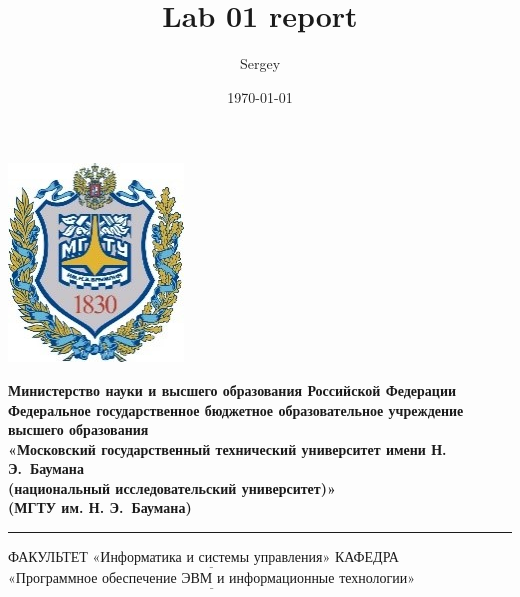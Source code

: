 \documentclass[14pt,russian]{scrartcl}
\title{Lab 01 report}
\author{Sergey}
\date{\today}
\begin{document}
\thispagestyle{empty}

\noindent \begin{minipage}{0.15\textwidth}
	\includegraphics[width=\linewidth]{b_logo}
\end{minipage}
\noindent\begin{minipage}{0.85\textwidth}\centering
	\textbf{Министерство науки и высшего образования Российской Федерации}\\
	\textbf{Федеральное государственное бюджетное образовательное учреждение высшего образования}\\
	\textbf{«Московский государственный технический университет имени Н. Э.~Баумана}\\
	\textbf{(национальный исследовательский университет)»}\\
	\textbf{(МГТУ им. Н. Э.~Баумана)}
\end{minipage}

\noindent\rule{16cm}{3pt}
\newline\newline
\noindent ФАКУЛЬТЕТ $\underline{\text{«Информатика и системы управления»}}$ \newline\newline
\noindent КАФЕДРА $\underline{\text{«Программное обеспечение ЭВМ и информационные технологии»}}$\newline
\end{document}

